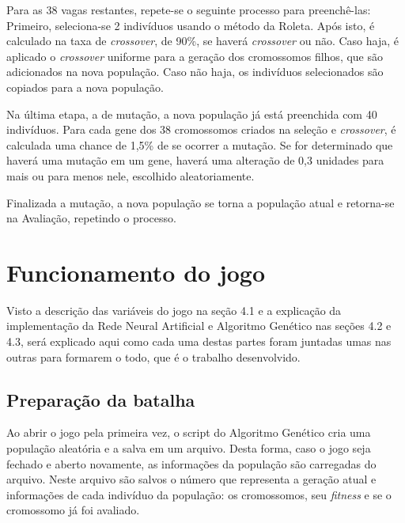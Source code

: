 \documentclass[
	12pt,					%
	openright,				%
	oneside,				%
	a4paper,				%
	bibjustif,				%
	chapter=TITLE,			%
	english,				%
	brazil,					%
	]{abntex2}
\begin{document}
	Para as 38 vagas restantes,
	repete-se o seguinte processo para preenchê-las:
	Primeiro, seleciona-se 2 indivíduos usando o método da Roleta.
	Após isto, é calculado na taxa de \textit{crossover}, de 90\%, se haverá \textit{crossover} ou não.
	Caso haja, é aplicado o \textit{crossover} uniforme para a geração dos cromossomos filhos,
	que são adicionados na nova população.
	Caso não haja, os indivíduos selecionados são copiados para a nova população.
	
	Na última etapa, a de mutação, a nova população já está preenchida com 40 indivíduos.
	Para cada gene dos 38 cromossomos criados na seleção e \textit{crossover},
	é calculada uma chance de 1,5\% de se ocorrer a mutação.
	Se for determinado que haverá uma mutação em um gene,
	haverá uma alteração de 0,3 unidades para mais ou para menos nele,
	escolhido aleatoriamente.
	
	Finalizada a mutação,
	a nova população se torna a população atual e retorna-se na Avaliação,
	repetindo o processo.
	
	\FloatBarrier
	\section{Funcionamento do jogo} \label{sec:funcionamentoDoJogo}
	Visto a descrição das variáveis do jogo na seção 4.1
	e a explicação da implementação da Rede Neural Artificial e Algoritmo Genético nas seções 4.2 e 4.3,
	será explicado aqui como cada uma destas partes foram juntadas umas nas outras para formarem o todo,
	que é o trabalho desenvolvido.
	
	\subsection{Preparação da batalha}
	Ao abrir o jogo pela primeira vez,
	o script do Algoritmo Genético cria uma população aleatória e a salva em um arquivo.
	Desta forma, caso o jogo seja fechado e aberto novamente,
	as informações da população são carregadas do arquivo.
	Neste arquivo são salvos o número que representa a geração atual
	e informações de cada indivíduo da população: os cromossomos, seu \textit{fitness} e se o cromossomo já foi avaliado.
	
\end{document}
